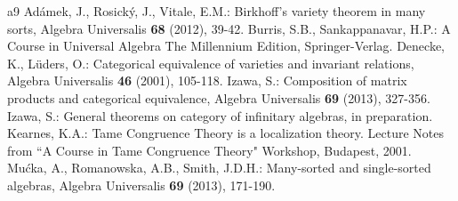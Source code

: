 \documentclass[a4paper,10pt]{article}
\theoremstyle{definition}
\begin{document}
\begin{thebibliography}{a9}
Ad\'amek, J., Rosick\'y, J., Vitale, E.M.: Birkhoff's variety theorem in many sorts, Algebra Universalis \textbf{68} (2012), 39-42.
Burris, S.B., Sankappanavar, H.P.: A Course in Universal Algebra 
The Millennium Edition, Springer-Verlag.
Denecke, K., L\"{u}ders, O.: Categorical equivalence of varieties and invariant relations, Algebra Universalis \textbf{46} (2001), 105-118.
Izawa, S.: Composition of matrix products and categorical equivalence, Algebra Universalis \textbf{69} (2013), 327-356.
Izawa, S.: General theorems on category of infinitary algebras, in preparation.
Kearnes, K.A.: Tame Congruence Theory is a localization theory. Lecture
Notes from ``A Course in Tame Congruence Theory" Workshop,
Budapest, 2001.
Mu\'{c}ka, A., Romanowska, A.B., Smith, J.D.H.: Many-sorted and single-sorted algebras, Algebra Universalis \textbf{69} (2013), 171-190.
\end{thebibliography}
\end{document}
